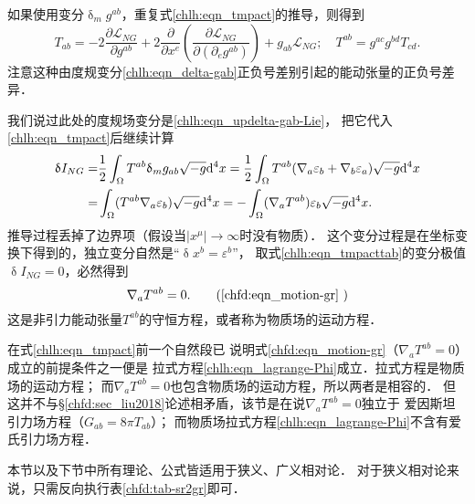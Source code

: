 如果使用变分$\updelta_{m} g^{ab}$，重复式\eqref{chlh:eqn_tmpact}的推导，则得到
\begin{equation}\label{chlh:eqn_BR-tensor-2}
    T_{ab} %
    = -2\frac{\partial \mathscr{L}_{NG}}{\partial g^{ab}}
    + 2\frac{\partial }{\partial x^e} \left(
    \frac{\partial \mathscr{L}_{NG}}{\partial (\partial_e g^{ab})}  \right)
    +  g_{ab} \mathscr{L}_{NG} 
    ; \quad    T^{ab} = g^{ac}g^{bd} T_{cd} .
\end{equation}
注意这种由度规变分\eqref{chlh:eqn_delta-gab}正负号差别引起的能动张量的正负号差异．



我们说过此处的度规场变分是\eqref{chlh:eqn_updelta-gab-Lie}，
把它代入\eqref{chlh:eqn_tmpact}后继续计算
\begin{equation}\label{chlh:eqn_tmpacttab}
    \begin{aligned}
        \updelta I_{NG} =& \frac{1}{2}\int_\Omega
        T^{ab}   \updelta_{m} g_{ab} \sqrt{-g} {\rm d}^{4}x
        = \frac{1}{2}\int_\Omega T^{ab}
          (\nabla_a \varepsilon_b + \nabla_b \varepsilon_a )
        \sqrt{-g} {\rm d}^{4}x \\
        =& \int_\Omega (T^{ab} \nabla_a \varepsilon_b) \sqrt{-g} {\rm d}^{4}x
        = -\int_\Omega  (\nabla_aT^{ab})  \varepsilon_b \sqrt{-g} {\rm d}^{4}x .
    \end{aligned}
\end{equation}
推导过程丢掉了边界项（假设当$|x^\mu|\to \infty$时没有物质）．
这个变分过程是在坐标变换下得到的，独立变分自然是“$\updelta x^b =\varepsilon^b$”，
取式\eqref{chlh:eqn_tmpacttab}的变分极值$\updelta I_{NG}=0$，必然得到
\begin{equation}   %
    \nabla_a T^{ab} = 0 .  \tag{\ref{chfd:eqn_motion-gr} }
\end{equation}
这是非引力能动张量$T^{ab}$的守恒方程，或者称为{\heiti 物质场的运动方程}．

{\kaishu 在式\eqref{chlh:eqn_tmpact}前一个自然段已
说明式\eqref{chfd:eqn_motion-gr}（$\nabla_a T^{ab} = 0$）成立的前提条件之一便是
拉式方程\eqref{chlh:eqn_lagrange-Phi}成立．拉式方程是物质场的运动方程；
而$\nabla_a T^{ab} = 0$也包含物质场的运动方程，所以两者是相容的．
但这并不与\S\ref{chfd:sec_liu2018}论述相矛盾，该节是在说$\nabla_a T^{ab} = 0$独立于
爱因斯坦引力场方程（$G_{ab}=8\pi T_{ab}$）；
而物质场拉式方程\eqref{chlh:eqn_lagrange-Phi}不含有爱氏引力场方程．}

本节以及下节中所有理论、公式皆适用于狭义、广义相对论．
对于狭义相对论来说，只需反向执行表\ref{chfd:tab-sr2gr}即可．






